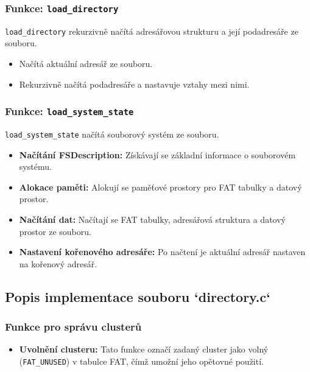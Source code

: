 \documentclass[12pt]{article}
\begin{document}
\subsubsection*{Funkce: \texttt{load\_directory}}

\texttt{load\_directory} rekurzivně načítá adresářovou strukturu a její podadresáře ze souboru.

\begin{itemize}
    \item Načítá aktuální adresář ze souboru.
    \item Rekurzivně načítá podadresáře a nastavuje vztahy mezi nimi.
\end{itemize}

\subsubsection*{Funkce: \texttt{load\_system\_state}}

\texttt{load\_system\_state} načítá souborový systém ze souboru.

\begin{itemize}
    \item \textbf{Načítání FSDescription:} Získávají se základní informace o souborovém systému.
    \item \textbf{Alokace paměti:} Alokují se paměťové prostory pro FAT tabulky a datový prostor.
    \item \textbf{Načítání dat:} Načítají se FAT tabulky, adresářová struktura a datový prostor ze souboru.
    \item \textbf{Nastavení kořenového adresáře:} Po načtení je aktuální adresář nastaven na kořenový adresář.
\end{itemize}

\subsection*{Popis implementace souboru `directory.c`}



\subsubsection*{Funkce pro správu clusterů}
\begin{itemize}
    \item \textbf{Uvolnění clusteru:} Tato funkce označí zadaný cluster jako volný (\texttt{FAT\_UNUSED}) v tabulce FAT, čímž umožní jeho opětovné použití.
\end{itemize}
\end{document}
